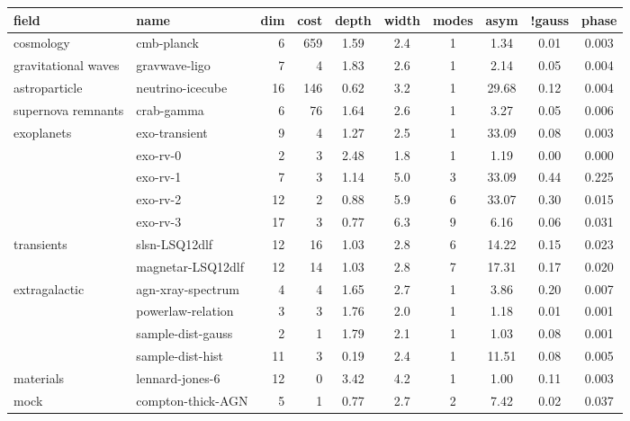 
\begin{tabular}{ll|rrcccccc}
field                & name                 & dim & cost & depth & width & modes & asym & !gauss & phase \\
\hline
\hline
cosmology            & cmb-planck           & 6   & 659  & 1.59 & 2.4 &    1 & 1.34 & 0.01 & 0.003 \\
gravitational waves  & gravwave-ligo        & 7   & 4    & 1.83 & 2.6 &    1 & 2.14 & 0.05 & 0.004 \\
astroparticle        & neutrino-icecube     & 16  & 146  & 0.62 & 3.2 &    1 & 29.68 & 0.12 & 0.004 \\
supernova remnants   & crab-gamma           & 6   & 76   & 1.64 & 2.6 &    1 & 3.27 & 0.05 & 0.006 \\
exoplanets           & exo-transient        & 9   & 4    & 1.27 & 2.5 &    1 & 33.09 & 0.08 & 0.003 \\
                     & exo-rv-0             & 2   & 3    & 2.48 & 1.8 &    1 & 1.19 & 0.00 & 0.000 \\
                     & exo-rv-1             & 7   & 3    & 1.14 & 5.0 &    3 & 33.09 & 0.44 & 0.225 \\
                     & exo-rv-2             & 12  & 2    & 0.88 & 5.9 &    6 & 33.07 & 0.30 & 0.015 \\
                     & exo-rv-3             & 17  & 3    & 0.77 & 6.3 &    9 & 6.16 & 0.06 & 0.031 \\
transients           & slsn-LSQ12dlf        & 12  & 16   & 1.03 & 2.8 &    6 & 14.22 & 0.15 & 0.023 \\
                     & magnetar-LSQ12dlf    & 12  & 14   & 1.03 & 2.8 &    7 & 17.31 & 0.17 & 0.020 \\
extragalactic        & agn-xray-spectrum    & 4   & 4    & 1.65 & 2.7 &    1 & 3.86 & 0.20 & 0.007 \\
                     & powerlaw-relation    & 3   & 3    & 1.76 & 2.0 &    1 & 1.18 & 0.01 & 0.001 \\
                     & sample-dist-gauss    & 2   & 1    & 1.79 & 2.1 &    1 & 1.03 & 0.08 & 0.001 \\
                     & sample-dist-hist     & 11  & 3    & 0.19 & 2.4 &    1 & 11.51 & 0.08 & 0.005 \\
materials            & lennard-jones-6      & 12  & 0    & 3.42 & 4.2 &    1 & 1.00 & 0.11 & 0.003 \\
\hline
mock                 & compton-thick-AGN    & 5   & 1    & 0.77 & 2.7 &    2 & 7.42 & 0.02 & 0.037 \\

\end{tabular}
